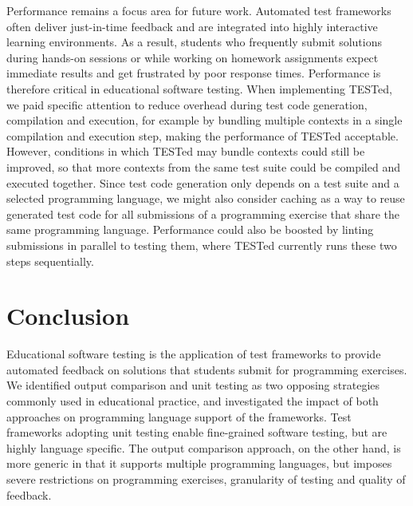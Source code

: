 \documentclass[../main]{subfiles}
\begin{document}
Performance remains a focus area for future work.
Automated test frameworks often deliver just-in-time feedback and are integrated into highly interactive learning environments.
As a result, students who frequently submit solutions during hands-on sessions or while working on homework assignments expect immediate results and get frustrated by poor response times.
Performance is therefore critical in educational software testing.
When implementing TESTed, we paid specific attention to reduce overhead during test code generation, compilation and execution, for example by bundling multiple contexts in a single compilation and execution step, making the performance of TESTed acceptable.
However, conditions in which TESTed may bundle contexts could still be improved, so that more contexts from the same test suite could be compiled and executed together.
Since test code generation only depends on a test suite and a selected programming language, we might also consider caching as a way to reuse generated test code for all submissions of a programming exercise that share the same programming language.
Performance could also be boosted by linting submissions in parallel to testing them, where TESTed currently runs these two steps sequentially.

\section{Conclusion}\label{sec:tested1-conclusion}

Educational software testing is the application of test frameworks to provide automated feedback on solutions that students submit for programming exercises.
We identified output comparison and unit testing as two opposing strategies commonly used in educational practice, and investigated the impact of both approaches on programming language support of the frameworks.
Test frameworks adopting unit testing enable fine-grained software testing, but are highly language specific.
The output comparison approach, on the other hand, is more generic in that it supports multiple programming languages, but imposes severe restrictions on programming exercises, granularity of testing and quality of feedback.
\end{document}
